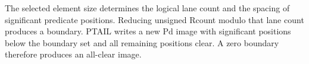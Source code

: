 The selected element size determines the logical lane count and the spacing of
significant predicate positions.  Reducing unsigned Rcount modulo that lane
count produces a boundary.  PTAIL writes a new Pd image with significant
positions below the boundary set and all remaining positions clear.  A zero
boundary therefore produces an all-clear image.
